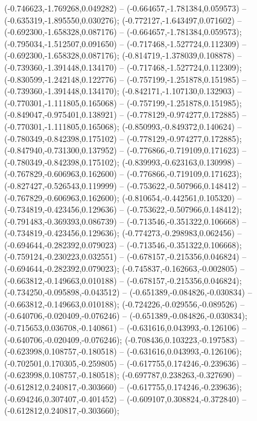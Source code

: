  (-0.746623,-1.769268,0.049282) -- (-0.664657,-1.781384,0.059573) -- (-0.635319,-1.895550,0.030276);
 (-0.772127,-1.643497,0.071602) -- (-0.692300,-1.658328,0.087176) -- (-0.664657,-1.781384,0.059573);
 (-0.795034,-1.512507,0.091650) -- (-0.717468,-1.527724,0.112309) -- (-0.692300,-1.658328,0.087176);
 (-0.814719,-1.378039,0.108878) -- (-0.739360,-1.391448,0.134170) -- (-0.717468,-1.527724,0.112309);
 (-0.830599,-1.242148,0.122776) -- (-0.757199,-1.251878,0.151985) -- (-0.739360,-1.391448,0.134170);
 (-0.842171,-1.107130,0.132903) -- (-0.770301,-1.111805,0.165068) -- (-0.757199,-1.251878,0.151985);
 (-0.849047,-0.975401,0.138921) -- (-0.778129,-0.974277,0.172885) -- (-0.770301,-1.111805,0.165068);
 (-0.850993,-0.849372,0.140624) -- (-0.780349,-0.842398,0.175102) -- (-0.778129,-0.974277,0.172885);
 (-0.847940,-0.731300,0.137952) -- (-0.776866,-0.719109,0.171623) -- (-0.780349,-0.842398,0.175102);
 (-0.839993,-0.623163,0.130998) -- (-0.767829,-0.606963,0.162600) -- (-0.776866,-0.719109,0.171623);
 (-0.827427,-0.526543,0.119999) -- (-0.753622,-0.507966,0.148412) -- (-0.767829,-0.606963,0.162600);
 (-0.810654,-0.442561,0.105320) -- (-0.734819,-0.423456,0.129636) -- (-0.753622,-0.507966,0.148412);
 (-0.791483,-0.369393,0.086739) -- (-0.713546,-0.351322,0.106668) -- (-0.734819,-0.423456,0.129636);
 (-0.774273,-0.298983,0.062456) -- (-0.694644,-0.282392,0.079023) -- (-0.713546,-0.351322,0.106668);
 (-0.759124,-0.230223,0.032551) -- (-0.678157,-0.215356,0.046824) -- (-0.694644,-0.282392,0.079023);
 (-0.745837,-0.162663,-0.002805) -- (-0.663812,-0.149663,0.010188) -- (-0.678157,-0.215356,0.046824);
 (-0.734250,-0.095898,-0.043512) -- (-0.651389,-0.084826,-0.030834) -- (-0.663812,-0.149663,0.010188);
 (-0.724226,-0.029556,-0.089526) -- (-0.640706,-0.020409,-0.076246) -- (-0.651389,-0.084826,-0.030834);
 (-0.715653,0.036708,-0.140861) -- (-0.631616,0.043993,-0.126106) -- (-0.640706,-0.020409,-0.076246);
 (-0.708436,0.103223,-0.197583) -- (-0.623998,0.108757,-0.180518) -- (-0.631616,0.043993,-0.126106);
 (-0.702501,0.170305,-0.259805) -- (-0.617755,0.174246,-0.239636) -- (-0.623998,0.108757,-0.180518);
 (-0.697787,0.238263,-0.327690) -- (-0.612812,0.240817,-0.303660) -- (-0.617755,0.174246,-0.239636);
 (-0.694246,0.307407,-0.401452) -- (-0.609107,0.308824,-0.372840) -- (-0.612812,0.240817,-0.303660);
